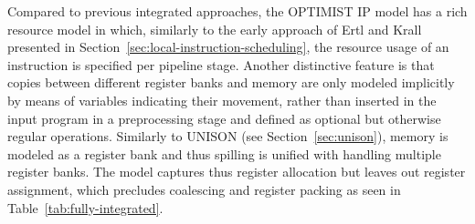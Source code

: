 \documentclass[acmsmall,authorversion,nonacm]{acmart}
\begin{document}
Compared to previous integrated approaches, the OPTIMIST IP model has
a rich resource model in which, similarly to the early approach of
Ertl and Krall presented in
Section~\ref{sec:local-instruction-scheduling}, the resource usage of
an instruction is specified per pipeline stage.
Another distinctive feature is that copies between different register
banks and memory are only modeled implicitly by means of variables
indicating their movement, rather than inserted in the input program
in a preprocessing stage and defined as optional but otherwise regular
operations.
Similarly to UNISON (see
Section~\ref{sec:unison}),
memory is modeled as a register bank and thus spilling is unified with
handling multiple register banks.
The model captures thus register allocation but leaves out register
assignment, which precludes coalescing and register packing as seen in
Table~\ref{tab:fully-integrated}.
\end{document}
